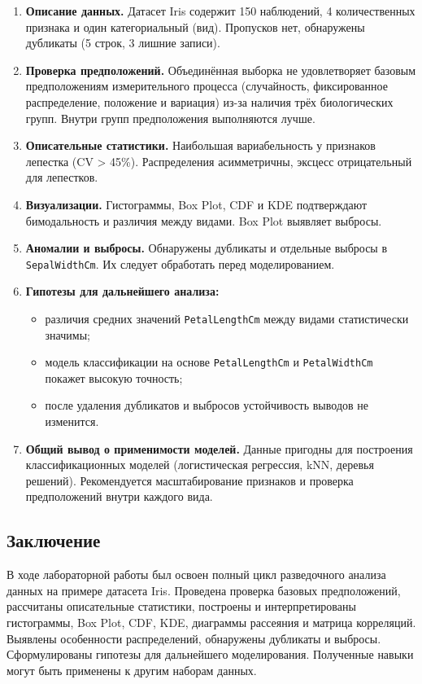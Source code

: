 \begin{enumerate}
    \item \textbf{Описание данных.} Датасет Iris содержит 150 наблюдений, 4 количественных признака и один категориальный (вид). Пропусков нет, обнаружены дубликаты (5 строк, 3 лишние записи).
    \item \textbf{Проверка предположений.} Объединённая выборка не удовлетворяет базовым предположениям измерительного процесса (случайность, фиксированное распределение, положение и вариация) из-за наличия трёх биологических групп. Внутри групп предположения выполняются лучше.
    \item \textbf{Описательные статистики.} Наибольшая вариабельность у признаков лепестка (CV > 45\%). Распределения асимметричны, эксцесс отрицательный для лепестков.
    \item \textbf{Визуализации.} Гистограммы, Box Plot, CDF и KDE подтверждают бимодальность и различия между видами. Box Plot выявляет выбросы.
    \item \textbf{Аномалии и выбросы.} Обнаружены дубликаты и отдельные выбросы в \texttt{SepalWidthCm}. Их следует обработать перед моделированием.
    \item \textbf{Гипотезы для дальнейшего анализа:}
    \begin{itemize}
        \item различия средних значений \texttt{PetalLengthCm} между видами статистически значимы;
        \item модель классификации на основе \texttt{PetalLengthCm} и \texttt{PetalWidthCm} покажет высокую точность;
        \item после удаления дубликатов и выбросов устойчивость выводов не изменится.
    \end{itemize}
    \item \textbf{Общий вывод о применимости моделей.} Данные пригодны для построения классификационных моделей (логистическая регрессия, kNN, деревья решений). Рекомендуется масштабирование признаков и проверка предположений внутри каждого вида.
\end{enumerate}

\subsection{Заключение}

В ходе лабораторной работы был освоен полный цикл разведочного анализа данных на примере датасета Iris. Проведена проверка базовых предположений, рассчитаны описательные статистики, построены и интерпретированы гистограммы, Box Plot, CDF, KDE, диаграммы рассеяния и матрица корреляций. Выявлены особенности распределений, обнаружены дубликаты и выбросы. Сформулированы гипотезы для дальнейшего моделирования. Полученные навыки могут быть применены к другим наборам данных.

